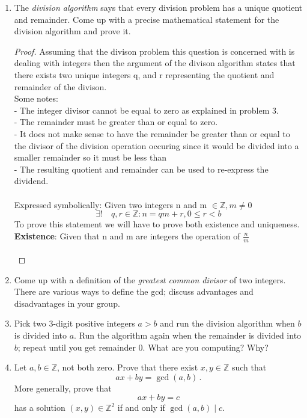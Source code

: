 \documentclass[11pt]{article}
\def\Z{\mathbb{Z}}
\begin{document}
\begin{enumerate}
\item The \emph{division algorithm} says that every division problem has a unique quotient and remainder.
Come up with a precise mathematical statement for the division algorithm and prove it.

\begin{proof}
  Assuming that the divison problem this question is concerned with is dealing with integers then the argument of the divison algorithm states that there exists two unique integers q, and r representing the quotient and remainder of the divison. \\
  Some notes:\\
   - The integer divisor cannot be equal to zero as explained in problem 3. \\
   - The remainder must be greater than or equal to zero. \\
   - It does not make sense to have the remainder be greater than or equal to the divisor of the division operation occuring since it would be divided into a smaller remainder so it must be less than\\
   - The resulting quotient and remainder can be used to re-express the dividend.
   \\\\
   Expressed symbolically:
   Given two integers n and m $\in \mathbb{Z}, m \neq 0$
   \[
     \exists ! \quad q,r \in \mathbb{Z} : n= qm+r, 0 \leq r <b
   \]
   To prove this statement we will have to prove both existence and uniqueness.
   \textbf{Existence}:
   Given that n and m are integers the operation of $\frac{n}{m}$
   \\\\
\end{proof}

\item Come up with a definition of the \emph{greatest common divisor} of two integers.
There are various ways to define the gcd; discuss advantages and disadvantages in your group.

\item Pick two 3-digit positive integers $a > b$ and run the division algorithm when $b$ is divided into $a$.
Run the algorithm again when the remainder is divided into $b$; repeat until you get remainder 0.
What are you computing? Why?

\item Let $a, b \in \Z$, not both zero.
Prove that there exist $x, y \in \Z$ such that
\[
  ax+by = \gcd(a,b) \, .
\]
More generally, prove that
\[
  ax+by = c
\]
has a solution $(x,y) \in \Z^2$ if and only if $\gcd(a,b) \mid c$.


\end{enumerate}
\end{document}
